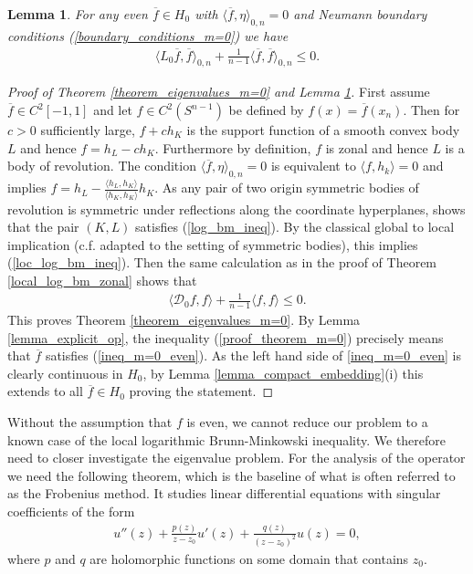 \documentclass[12pt,twoside]{amsart}
\numberwithin{satz}{section}
\newtheorem{lemma}[satz]{Lemma}
\theoremstyle{definition}
\numberwithin{equation}{section}
\begin{document}
	\begin{lemma}\label{lemma_m=0_even}
		For any even $\overline{f}\in H_0$ with $\langle \overline{f},\eta\rangle_{0,n}=0$ and Neumann boundary conditions (\ref{boundary_conditions_m=0}) we have
		\begin{align}\label{ineq_m=0_even}
			\langle L_0\overline{f},\overline{f}\rangle_{0,n} + \frac{1}{n-1}\langle \overline{f},\overline{f}\rangle_{0,n}\leq 0.
		\end{align}
	\end{lemma}
	\begin{proof}[Proof of Theorem \ref{theorem_eigenvalues_m=0} and Lemma \ref{lemma_m=0_even}]
		First assume $\overline{f}\in C^2[-1,1]$ and let $f\in C^2(S^{n-1})$ be defined by $f(x)=\overline{f}(x_n)$. Then for $c>0$ sufficiently large, $f+ch_K$ is the support function of a smooth convex body $L$ and hence $f=h_L-ch_K$. Furthermore by definition, $f$ is zonal and hence $L$ is a body of revolution. The condition $\langle \overline{f},\eta\rangle_{0,n}=0$ is equivalent to $\langle f,h_k\rangle=0$ and implies $f=h_L-\frac{\langle h_L,h_K\rangle}{\langle h_K,h_K\rangle}h_K$. As any pair of two origin symmetric bodies of revolution is symmetric under reflections along the coordinate hyperplanes, \cite[Theorem 2]{boeroeczkykalantzopoulos} shows that the pair $(K,L)$ satisfies (\ref{log_bm_ineq}). By the classical global to local implication (c.f. \cite[Theorem 3.4]{kolesnikovmilman} adapted to the setting of symmetric bodies), this implies (\ref{loc_log_bm_ineq}). Then the same calculation as in the proof of Theorem \ref{local_log_bm_zonal} shows that
		\begin{align}\label{proof_theorem_m=0}
			\langle \mathcal{D}_0 f,f\rangle + \frac{1}{n-1}\langle f,f\rangle \leq 0.
		\end{align}
		This proves Theorem \ref{theorem_eigenvalues_m=0}. By Lemma \ref{lemma_explicit_op}, the inequality (\ref{proof_theorem_m=0}) precisely means that $\overline{f}$ satisfies (\ref{ineq_m=0_even}).
		As the left hand side of \eqref{ineq_m=0_even} is clearly continuous in $H_0$, by Lemma \ref{lemma_compact_embedding}(i) this extends to all $\overline{f}\in H_0$ proving the statement.
		
	\end{proof}
	
	Without the assumption that $f$ is even, we cannot reduce our problem to a known case of the local logarithmic Brunn-Minkowski inequality. We therefore need to closer investigate the eigenvalue problem. For the analysis of the operator we need the following theorem, which is the baseline of what is often referred to as the Frobenius method. It studies linear differential equations with singular coefficients of the form
	\begin{align}\label{fuchs_eq}
		u''(z)+\frac{p(z)}{z-z_0}u'(z)+\frac{q(z)}{(z-z_0)^2}u(z)=0,
	\end{align}
	where $p$ and $q$ are holomorphic functions on some domain that contains $z_0$.
	
\end{document}
